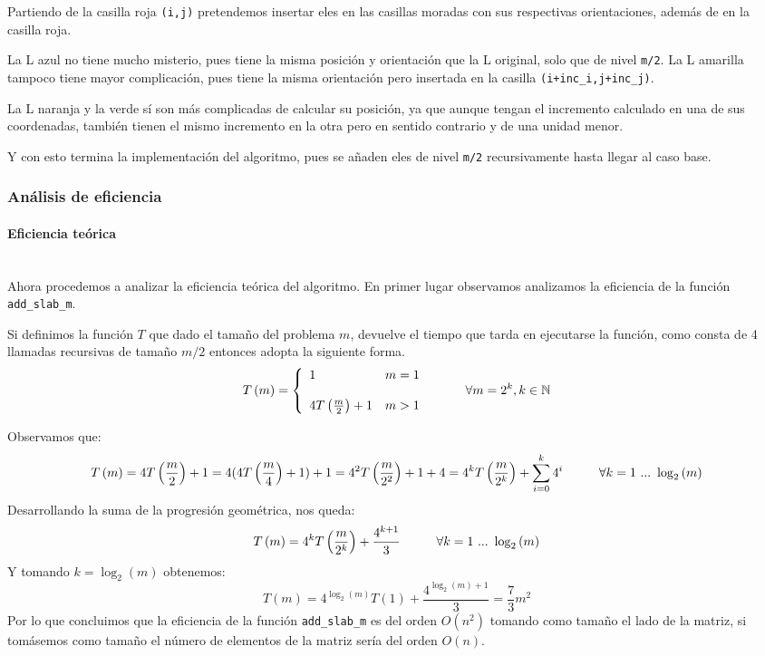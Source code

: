 \documentclass{article}
\newcommand{\myparagraph}[1]{\paragraph{#1}\mbox{}\\}
\newcommand\N{\ensuremath{\mathbb N}\space}
\begin{document}
    Partiendo de la casilla roja \texttt{(i,j)} pretendemos insertar eles
    en las casillas moradas con sus respectivas orientaciones, además de en
    la casilla roja.

    La L azul no tiene mucho misterio, pues tiene la misma posición y orientación
    que la L original, solo que de nivel \texttt{m/2}. La L amarilla tampoco
    tiene mayor complicación, pues tiene la misma orientación pero insertada
    en la casilla \texttt{(i+inc\_i,j+inc\_j)}.

    La L naranja y la verde sí son más complicadas de calcular su posición,
    ya que aunque tengan el incremento calculado en una de sus coordenadas,
    también tienen el mismo incremento en la otra pero en sentido contrario
    y de una unidad menor.

    Y con esto termina la implementación del algoritmo, pues se añaden
    eles de nivel \texttt{m/2} recursivamente hasta llegar al caso base. \\
\subsubsection{Análisis de eficiencia} %
\myparagraph{Eficiencia teórica} %

    Ahora procedemos a analizar la eficiencia teórica del algoritmo.
    En primer lugar observamos analizamos la eficiencia de la función
     \texttt{add\_slab\_m}.

    Si definimos la función $T$ que dado el tamaño del problema $m$, devuelve
    el tiempo que tarda en ejecutarse la función, como consta de 4 llamadas
    recursivas de tamaño $m/2$ entonces adopta la siguiente forma. \\

    \begin{equation} \label{eq:ef_dyv_p1}
    T\left(m\right) = \left\{ \begin{array}{lcc} 1 & m = 1  \\ \\ 
    4T\left(\frac{m}{2}\right) + 1 &  m > 1  \\ \end{array} \right. \hspace{10mm} \forall m = 2^k, k \in \N
    \end{equation} 

    Observamos que: 
\[
    T\left(m\right) = 4T\left(\frac{m}{2}\right)+1 = 4(4T\left(\frac{m}{4}\right)+1)+1= 
    4^2T\left(\frac{m}{2^2}\right)+1+4=4^kT\left(\frac{m}{2^k}\right)+\sum_{i=0}^k4^i \hspace{10mm}\forall k = 1\ ...\ \log_2\left(m\right)
\]
   Desarrollando la suma de la progresión geométrica, nos queda:
\[
    T\left(m\right) = 4^kT\left(\frac{m}{2^k}\right)+\frac{4^{k+1}}{3} \hspace{10mm}\forall k = 1\ ...\ \log_2\left(m\right)
\]
    Y tomando $k=\log_2\left(m\right)$ obtenemos:
\[
    T\left(m\right) = 4^{\log_2\left(m\right)}T(1)+\frac{4^{\log_2\left(m\right)+1}}{3}=\frac{7}{3}m^2
\]    
    Por lo que concluimos que la eficiencia de la función \texttt{add\_slab\_m} es del orden $O(n^2)$ tomando como tamaño
    el lado de la matriz, si tomásemos como tamaño el número de elementos
    de la matriz sería del orden $O(n)$.
\end{document}
